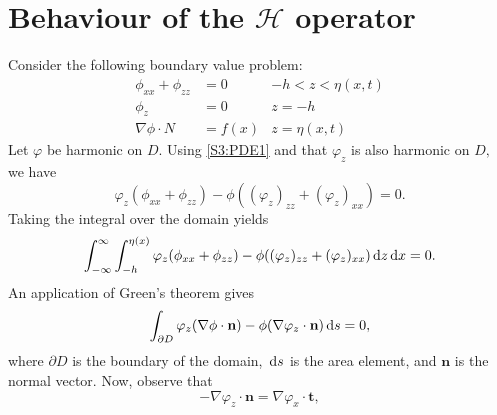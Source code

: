 \section{Behaviour of the $\mathcal{H}$ operator}
Consider the following boundary value problem:
\begin{subequations}
\begin{align}
\phi_{xx} + \phi_{zz} &= 0 &-h < z < \eta(x,t) \label{S3:PDE1}\\
\phi_{z} &= 0 &z = -h \label{S3:BBC}\\
\nabla  \phi \cdot N &= f(x )& z = \eta(x,t) \label{S3:KBC}
\end{align}
\end{subequations}
Let $\varphi$ be harmonic on $D.$ Using \eqref{S3:PDE1} and that $\varphi_z$ is also harmonic on $D,$ we have
\[ \varphi_z(\phi_{xx} + \phi_{zz}) - \phi((\varphi_z)_{zz} + (\varphi_{z})_{xx}) = 0. \]
Taking the integral over the domain yields
\[ \int^{\infty}_{-\infty} \int^{\eta(x)}_{-h} \varphi_z(\phi_{xx} + \phi_{zz}) - \phi((\varphi_z)_{zz} + (\varphi_{z})_{xx}) \,\mathrm{d} z \,\mathrm{d} x = 0.\]
An application of Green's theorem gives 
\begin{equation}\label{S3:dInt}
\int_{\partial D} \varphi_z(\nabla  \phi \cdot \textbf{n}) - \phi(\nabla  \varphi_z \cdot \textbf{n}) \,\mathrm{d} s = 0,
\end{equation} 
where $\partial D$ is the boundary of the domain, $\,\mathrm{d} s$ is the area element, and $\textbf{n}$ is the normal vector. Now, observe that
\[- \nabla \varphi_z \cdot \textbf{n} = \nabla  \varphi_x \cdot \textbf{t}, \]
